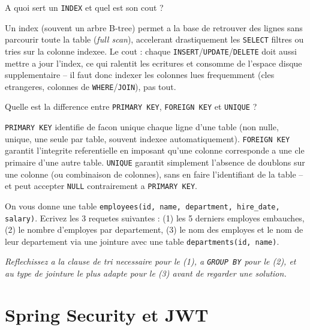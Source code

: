 \documentclass[11pt,a4paper]{article}
\begin{document}
\begin{question} A quoi sert un \texttt{INDEX} et quel est son cout ?
\end{question}
\begin{reponse}
Un index (souvent un arbre B-tree) permet a la base de retrouver des lignes sans parcourir toute la table (\emph{full scan}), accelerant drastiquement les \texttt{SELECT} filtres ou tries sur la colonne indexee. Le cout : chaque \texttt{INSERT}/\texttt{UPDATE}/\texttt{DELETE} doit aussi mettre a jour l'index, ce qui ralentit les ecritures et consomme de l'espace disque supplementaire -- il faut donc indexer les colonnes lues frequemment (cles etrangeres, colonnes de \texttt{WHERE}/\texttt{JOIN}), pas tout.
\end{reponse}

\begin{question} Quelle est la difference entre \texttt{PRIMARY KEY}, \texttt{FOREIGN KEY} et \texttt{UNIQUE} ?
\end{question}
\begin{reponse}
\texttt{PRIMARY KEY} identifie de facon unique chaque ligne d'une table (non nulle, unique, une seule par table, souvent indexee automatiquement). \texttt{FOREIGN KEY} garantit l'integrite referentielle en imposant qu'une colonne corresponde a une cle primaire d'une autre table. \texttt{UNIQUE} garantit simplement l'absence de doublons sur une colonne (ou combinaison de colonnes), sans en faire l'identifiant de la table -- et peut accepter \texttt{NULL} contrairement a \texttt{PRIMARY KEY}.
\end{reponse}

\begin{coding}
On vous donne une table \texttt{employees(id, name, department, hire\_date, salary)}. Ecrivez les 3 requetes suivantes : (1) les 5 derniers employes embauches, (2) le nombre d'employes par departement, (3) le nom des employes et le nom de leur departement via une jointure avec une table \texttt{departments(id, name)}.

\emph{Reflechissez a la clause de tri necessaire pour le (1), a \texttt{GROUP BY} pour le (2), et au type de jointure le plus adapte pour le (3) avant de regarder une solution.}
\end{coding}

\newpage
\section{Spring Security et JWT}
\end{document}
